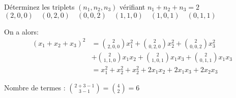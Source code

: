 \noindent Déterminez les triplets $(n_1, n_2, n_3)$ vérifiant $n_1 + n_2 + n_3 = 2$
$(2,0,0) \quad (0,2,0) \quad (0,0,2) \quad
 (1,1,0) \quad (1,0,1) \quad (0,1,1)$

\noindent On a alors:
\begin{align*}
	(x_1 + x_2 + x_3)^2 & = \binom{2}{2,0,0}x_1^2 + \binom{2}{0,2,0}x_2^2 + \binom{2}{0,0,2}x_3^2       \\
	                    & + \binom{2}{1,1,0}x_1 x_2 + \binom{2}{1,0,1}x_1 x_3 + \binom{2}{0,1,1}x_1 x_3 \\
	                    & = x_1^2 + x_2^2 + x_2^2 + 2 x_1 x_2 + 2 x_1 x_3 + 2 x_2 x_3
\end{align*}

Nombre de termes : $\binom{2+3-1}{3-1} = \binom{4}{2} = 6$